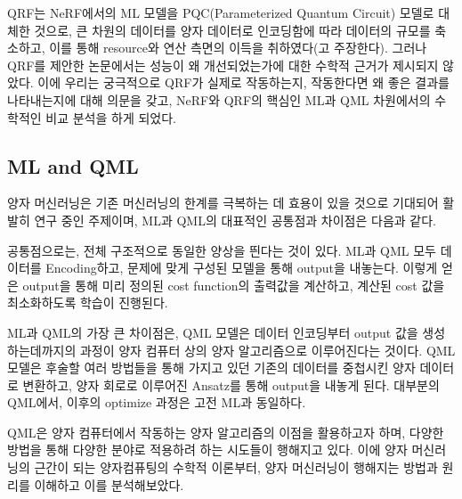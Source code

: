QRF는 NeRF에서의 ML 모델을 PQC(Parameterized Quantum Circuit) 모델로 대체한 것으로, 큰 차원의 데이터를 양자 데이터로 인코딩함에 따라 데이터의 규모를 축소하고, 이를 통해 resource와 연산 측면의 이득을 취하였다(고 주장한다). 그러나 QRF를 제안한 논문에서는 성능이 왜 개선되었는가에 대한 수학적 근거가 제시되지 않았다. 이에 우리는 궁극적으로 QRF가 실제로 작동하는지, 작동한다면 왜 좋은 결과를 나타내는지에 대해 의문을 갖고, NeRF와 QRF의 핵심인 ML과 QML 차원에서의 수학적인 비교 분석을 하게 되었다.


\subsection{ML and QML}\label{ss:ml and qml}

양자 머신러닝은 기존 머신러닝의 한계를 극복하는 데 효용이 있을 것으로 기대되어 활발히 연구 중인 주제이며, ML과 QML의 대표적인 공통점과 차이점은 다음과 같다.

공통점으로는, 전체 구조적으로 동일한 양상을 띈다는 것이 있다. ML과 QML 모두 데이터를 Encoding하고, 문제에 맞게 구성된 모델을 통해 output을 내놓는다. 이렇게 얻은 output을 통해 미리 정의된 cost function의 출력값을 계산하고, 계산된 cost 값을 최소화하도록 학습이 진행된다.

ML과 QML의 가장 큰 차이점은, QML 모델은 데이터 인코딩부터 output 값을 생성하는데까지의 과정이 양자 컴퓨터 상의 양자 알고리즘으로 이루어진다는 것이다. QML 모델은 후술할 여러 방법들을 통해 가지고 있던 기존의 데이터를 중첩시킨 양자 데이터로 변환하고, 양자 회로로 이루어진 Ansatz를 통해 output을 내놓게 된다. 대부분의 QML에서, 이후의 optimize 과정은 고전 ML과 동일하다.

QML은 양자 컴퓨터에서 작동하는 양자 알고리즘의 이점을 활용하고자 하며, 다양한 방법을 통해 다양한 분야로 적용하려 하는 시도들이 행해지고 있다. 이에 양자 머신러닝의 근간이 되는 양자컴퓨팅의 수학적 이론부터, 양자 머신러닝이 행해지는 방법과 원리를 이해하고 이를 분석해보았다.


%
%
